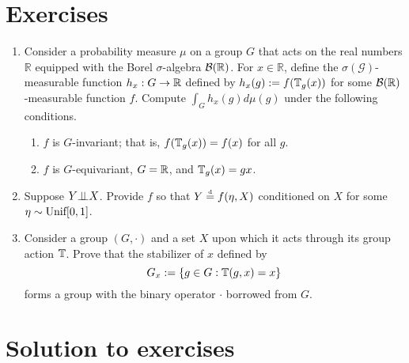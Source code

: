 

\section{Exercises}

\begin{enumerate}
	\item 
	Consider a probability measure $\mu$ on a group $G$ that acts on the real numbers $\mathbb{R}$ equipped with the Borel $\sigma$-algebra $\mathcal{B}(\mathbb{R})$.
	For $x \in \mathbb{R}$, define the $\sigma(\mathcal{G})$-measurable function $h_x: G \to \mathbb{R}$ defined by $h_x(g) := f(\mathbb{T}_g(x))$ for some $\mathcal{B}(\mathbb{R})$-measurable function $f$.
	Compute $\int_{G} h_x(g) d\mu(g)$ under the following conditions.
	\begin{enumerate}[label=(\alph*)]
		\item
		$f$ is $G$-invariant; that is, $f(\mathbb{T}_g(x)) = f(x)$ for all $g$.
		
		\item $f$ is $G$-equivariant, $G = \mathbb{R}$, and $\mathbb{T}_g(x) = gx$.
	\end{enumerate}
	
	\item
	Suppose $Y {\perp\!\!\!\perp} X$.
	Provide $f$ so that $Y \stackrel{\text{\rm\tiny d}}{=} f(\eta,X)$ conditioned on $X$ for some $\eta \sim \text{\rm Unif}[0,1]$.
	
	\item Consider a group $(G, \cdot)$ and a set $X$ upon which it acts through its group action $\mathbb{T}$.
	Prove that the stabilizer of $x$ defined by
	$$
		G_x := \{ g \in G : \mathbb{T}(g,x) = x \}
	$$
	forms a group with the binary operator $\cdot$ borrowed from $G$.
\end{enumerate}

\pagebreak

\section{Solution to exercises}

